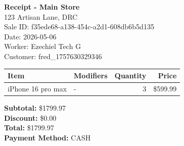 \documentclass[a4paper]{article}
\begin{document}
			\begin{center}
			\textbf{Receipt - Main Store} \\
			\small{123 Artisan Lane, DRC} \\
			\small{Sale ID: f35ede68-a138-454c-a2d1-608db6b5d135} \\
			\small{Date: 2026-05-06} \\
			\small{Worker: Ezechiel Tech G} \\
			\small{Customer: fred_1757630329346} \\
			\end{center}

			\vspace{0.5cm}

			\begin{tabular}{llrr}
			\toprule
			\textbf{Item} & \textbf{Modifiers} & \textbf{Quantity} & \textbf{Price} \\
			\midrule
			iPhone 16 pro max & - & 3 & \$599.99 \\
			\bottomrule
			\end{tabular}

			\vspace{0.5cm}

			\begin{flushright}
			\textbf{Subtotal:} \$1799.97 \\
			\textbf{Discount:} \$0.00 \\
			\textbf{Total:} \$1799.97 \\
			\textbf{Payment Method:} CASH \\
			
			\end{flushright}

			
\end{document}
